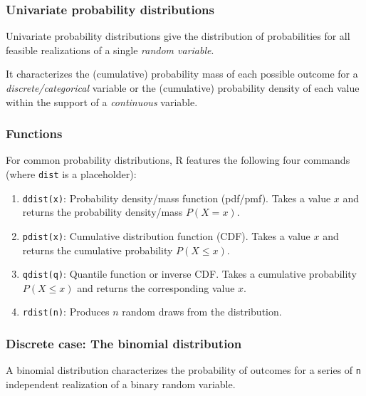 \documentclass[
  11pt,
]{article}
\providecommand{\tightlist}{%
  \setlength{\itemsep}{0pt}\setlength{\parskip}{0pt}}
\begin{document}
\hypertarget{univariate-probability-distributions}{%
\subsubsection{Univariate probability distributions}\label{univariate-probability-distributions}}

Univariate probability distributions give the distribution of probabilities for all feasible realizations of a single \emph{random variable}.

It characterizes the (cumulative) probability mass of each possible outcome for a \emph{discrete/categorical} variable or the (cumulative) probability density of each value within the support of a \emph{continuous} variable.

\hypertarget{functions}{%
\subsubsection{Functions}\label{functions}}

For common probability distributions, R features the following four commands (where \texttt{dist} is a placeholder):

\begin{enumerate}
\def\labelenumi{\arabic{enumi}.}
\tightlist
\item
  \texttt{ddist(x)}: Probability density/mass function (pdf/pmf). Takes a value \(x\) and returns the probability density/mass \(P(X=x)\).\\
\item
  \texttt{pdist(x)}: Cumulative distribution function (CDF). Takes a value \(x\) and returns the cumulative probability \(P(X \leq x)\).
\item
  \texttt{qdist(q)}: Quantile function or inverse CDF. Takes a cumulative probability \(P(X \leq x)\) and returns the corresponding value \(x\).
\item
  \texttt{rdist(n)}: Produces \(n\) random draws from the distribution.
\end{enumerate}

\hypertarget{discrete-case-the-binomial-distribution}{%
\subsubsection{Discrete case: The binomial distribution}\label{discrete-case-the-binomial-distribution}}

A binomial distribution characterizes the probability of outcomes for a series of \texttt{n} independent realization of a binary random variable.
\end{document}
